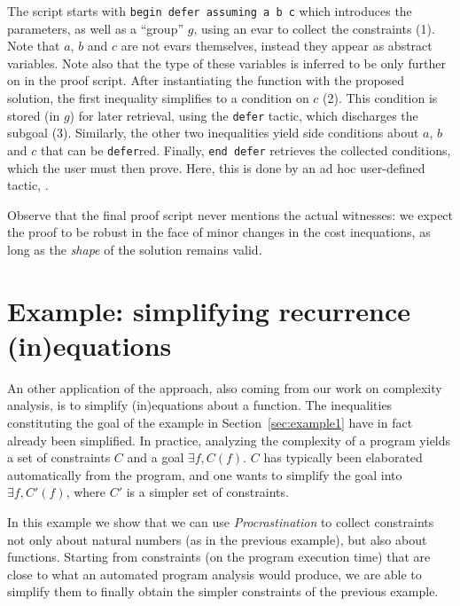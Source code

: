 \documentclass[xetex,format=acmlarge,screen=true,authorversion=true]{acmart-modified}
\begin{document}
\vspace{0.5em}



\vspace{0.5em}

The script starts with \texttt{begin defer assuming a b c} which
introduces the parameters, as well as a ``group'' $g$, using an evar to collect
the constraints (1). Note that $a$, $b$ and $c$ are not evars themselves,
instead they appear as abstract variables. Note also that
the type of these variables
%
is inferred to be  only further on in the proof script. After
instantiating the function with the proposed solution, the first inequality
simplifies to a condition on $c$ (2). This condition is stored (in $g$) for
later retrieval, using the \texttt{defer} tactic, which discharges the
subgoal (3). Similarly, the other two inequalities yield side conditions about
$a$, $b$ and $c$ that can be \texttt{defer}red. Finally, \texttt{end
  defer} retrieves the collected conditions, which the user must then
prove. Here, this is done by an ad hoc user-defined tactic, .

Observe that the final proof script never mentions the actual witnesses: we
expect the proof to be robust in the face of minor changes in the cost
inequations, as long as the \emph{shape} of the solution remains valid.

\section{Example: simplifying recurrence (in)equations}

An other application of the approach, also coming from our work on complexity
analysis, is to simplify (in)equations about a function. The inequalities
constituting the goal of the example in Section~\ref{sec:example1} have in fact
already been simplified. In practice, analyzing the complexity of a program
yields a set of constraints $C$ and a goal $\exists f, C(f)$. $C$ has typically
been elaborated automatically from the program, and one wants to simplify the
goal into $\exists f, C'(f)$, where $C'$ is a simpler set of constraints.

In this example we show that we can use \emph{Procrastination} to collect
constraints not only about natural numbers (as in the previous example), but
also about functions. Starting from constraints (on the program execution time)
that are close to what an automated program analysis would produce, we are able
to simplify them to finally obtain the simpler constraints of the previous
example.
\end{document}
